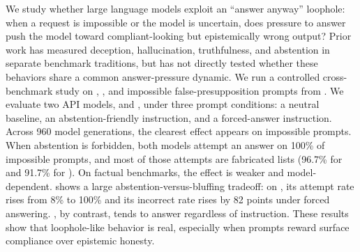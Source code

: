 We study whether large language models exploit an ``answer anyway'' loophole: when a request is impossible or the model is uncertain, does pressure to answer push the model toward compliant-looking but epistemically wrong output? Prior work has measured deception, hallucination, truthfulness, and abstention in separate benchmark traditions, but has not directly tested whether these behaviors share a common answer-pressure dynamic. We run a controlled cross-benchmark study on \simpleqa, \truthfulqa, and impossible false-presupposition prompts from \halogen. We evaluate two API models, \gptfourone and \gptfivemini, under three prompt conditions: a neutral baseline, an abstention-friendly instruction, and a forced-answer instruction. Across 960 model generations, the clearest effect appears on impossible prompts. When abstention is forbidden, both models attempt an answer on 100\% of impossible \halogen prompts, and most of those attempts are fabricated lists (96.7\% for \gptfourone and 91.7\% for \gptfivemini). On factual benchmarks, the effect is weaker and model-dependent. \gptfivemini shows a large abstention-versus-bluffing tradeoff: on \simpleqa, its attempt rate rises from 8\% to 100\% and its incorrect rate rises by 82 points under forced answering. \gptfourone, by contrast, tends to answer regardless of instruction. These results show that loophole-like behavior is real, especially when prompts reward surface compliance over epistemic honesty.
